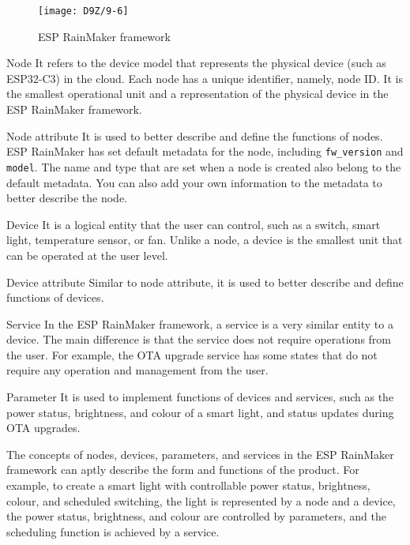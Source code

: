 \documentclass[a4paper,12pt]{book}
\begin{document}
\begin{figure}[!h]
    \centering
    \texttt{[image: D9Z/9-6]}
    \caption{ESP RainMaker framework}
\end{figure}

\begin{term}{Node}
    It refers to the device model that represents the physical device (such as ESP32-C3) in the cloud. Each node has a unique identifier, namely, node ID. It is the smallest operational unit and a representation of the physical device in the ESP RainMaker framework.
\end{term}

\begin{term}{Node attribute}
    It is used to better describe and define the functions of nodes. ESP RainMaker has set default metadata for the node, including \verb|fw_version| and \verb|model|. The name and type that are set when a node is created also belong to the default metadata. You can also add your own information to the metadata to better describe the node.
\end{term}

\begin{term}{Device}
    It is a logical entity that the user can control, such as a switch, smart light, temperature sensor, or fan. Unlike a node, a device is the smallest unit that can be operated at the user level.
\end{term}

\begin{term}{Device attribute}
    Similar to node attribute, it is used to better describe and define functions of devices.
\end{term}

\begin{term}{Service}
    In the ESP RainMaker framework, a service is a very similar entity to a device. The main difference is that the service does not require operations from the user. For example, the OTA upgrade service has some states that do not require any operation and management from the user.
\end{term}

\begin{term}{Parameter}
    It is used to implement functions of devices and services, such as the power status, brightness, and colour of a smart light, and status updates during OTA upgrades.
\end{term}

The concepts of nodes, devices, parameters, and services in the ESP RainMaker framework can aptly describe the form and functions of the product. For example, to create a smart light with controllable power status, brightness, colour, and scheduled switching, the light is represented by a node and a device, the power status, brightness, and colour are controlled by parameters, and the scheduling function is achieved by a service.
\end{document}
